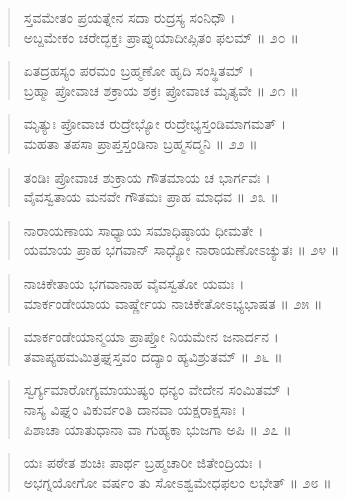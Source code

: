 \begin{verse}
ಸ್ತವಮೇತಂ ಪ್ರಯತ್ನೇನ ಸದಾ ರುದ್ರಸ್ಯ ಸಂನಿಧೌ ।\\ಅಬ್ದಮೇಕಂ ಚರೇದ್ಭಕ್ತಃ ಪ್ರಾಪ್ನುಯಾದೀಪ್ಸಿತಂ ಫಲಮ್ \num{॥ ೨೦ ॥}
\end{verse}

\begin{verse}
ಏತದ್ರಹಸ್ಯಂ ಪರಮಂ ಬ್ರಹ್ಮಣೋ ಹೃದಿ ಸಂಸ್ಥಿತಮ್ ।\\ಬ್ರಹ್ಮಾ ಪ್ರೋವಾಚ ಶಕ್ರಾಯ ಶಕ್ರಃ ಪ್ರೋವಾಚ ಮೃತ್ಯವೇ \num{॥ ೨೧ ॥}
\end{verse}

\begin{verse}
ಮೃತ್ಯುಃ ಪ್ರೋವಾಚ ರುದ್ರೇಭ್ಯೋ ರುದ್ರೇಭ್ಯಸ್ತಂಡಿಮಾಗಮತ್ ।\\ಮಹತಾ ತಪಸಾ ಪ್ರಾಪ್ತಸ್ತಂಡಿನಾ ಬ್ರಹ್ಮಸದ್ಮನಿ \num{॥ ೨೨ ॥}
\end{verse}

\begin{verse}
ತಂಡಿಃ ಪ್ರೋವಾಚ ಶುಕ್ರಾಯ ಗೌತಮಾಯ ಚ ಭಾರ್ಗವಃ ।\\ವೈವಸ್ವತಾಯ ಮನವೇ ಗೌತಮಃ ಪ್ರಾಹ ಮಾಧವ \num{॥ ೨೩ ॥}
\end{verse}

\begin{verse}
ನಾರಾಯಣಾಯ ಸಾಧ್ಯಾಯ ಸಮಾಧಿಷ್ಠಾಯ ಧೀಮತೇ ।\\ಯಮಾಯ ಪ್ರಾಹ ಭಗವಾನ್ ಸಾಧ್ಯೋ ನಾರಾಯಣೋಽಚ್ಯುತಃ \num{॥ ೨೪ ॥}
\end{verse}

\begin{verse}
ನಾಚಿಕೇತಾಯ ಭಗವಾನಾಹ ವೈವಸ್ವತೋ ಯಮಃ ।\\ಮಾರ್ಕಂಡೇಯಾಯ ವಾರ್ಷ್ಣೇಯ ನಾಚಿಕೇತೋಽಭ್ಯಭಾಷತ \num{॥ ೨೫ ॥}
\end{verse}

\begin{verse}
ಮಾರ್ಕಂಡೇಯಾನ್ಮಯಾ ಪ್ರಾಪ್ತೋ ನಿಯಮೇನ ಜನಾರ್ದನ ।\\ತವಾಪ್ಯಹಮಮಿತ್ರಘ್ನಸ್ತವಂ ದದ್ಯಾಂ ಹ್ಯವಿಶ್ರುತಮ್ \num{॥ ೨೬ ॥}
\end{verse}

\begin{verse}
ಸ್ವರ್ಗ್ಯಮಾರೋಗ್ಯಮಾಯುಷ್ಯಂ ಧನ್ಯಂ ವೇದೇನ ಸಂಮಿತಮ್ ।\\ನಾಸ್ಯ ವಿಘ್ನಂ ವಿಕುರ್ವಂತಿ ದಾನವಾ ಯಕ್ಷರಾಕ್ಷಸಾಃ ।\\ಪಿಶಾಚಾ ಯಾತುಧಾನಾ ವಾ ಗುಹ್ಯಕಾ ಭುಜಗಾ ಅಪಿ \num{॥ ೨೭ ॥}
\end{verse}

\begin{verse}
ಯಃ ಪಠೇತ ಶುಚಿಃ ಪಾರ್ಥ ಬ್ರಹ್ಮಚಾರೀ ಜಿತೇಂದ್ರಿಯಃ ।\\ಅಭಗ್ನಯೋಗೋ ವರ್ಷಂ ತು ಸೋಽಶ್ವಮೇಧಫಲಂ ಲಭೇತ್ \num{॥ ೨೮ ॥}
\end{verse}

